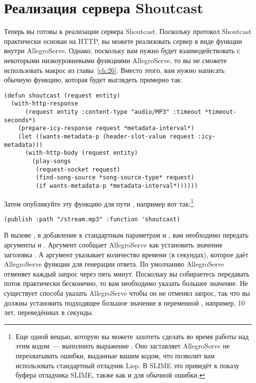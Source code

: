 \section{Реализация сервера Shoutcast}

Теперь вы готовы к реализации сервера Shoutcast. Поскольку протокол Shoutcast практически
основан на HTTP, вы можете реализовать сервер в виде функции внутри AllegroServe.  Однако,
поскольку вам нужно будет взаимодействовать с некоторыми низкоуровневыми функциями
AllegroServe, то вы не сможете использовать макрос  из
главы~\ref{ch:26}. Вместо этого, вам нужно написать обычную функцию, которая будет
выглядеть примерно так:

\begin{lstlisting}
(defun shoutcast (request entity)
  (with-http-response
      (request entity :content-type "audio/MP3" :timeout *timeout-seconds*)
    (prepare-icy-response request *metadata-interval*)
    (let ((wants-metadata-p (header-slot-value request :icy-metadata)))
      (with-http-body (request entity)
        (play-songs 
         (request-socket request)
         (find-song-source *song-source-type* request)
         (if wants-metadata-p *metadata-interval*))))))
\end{lstlisting}

Затем опубликуйте эту функцию для пути , например вот так:\footnote{Еще
  одной вещью, которую вы можете захотеть сделать во время работы над этим кодом~---
  выполнить выражение .  Оно заставляет AllegroServe
  не перехватывать ошибки, выданные вашим кодом, что позволит вам использовать стандартный
  отладчик Lisp.  В SLIME это приведёт к показу буфера отладчика SLIME, также как и для
  обычной ошибки.}

\begin{lstlisting}
(publish :path "/stream.mp3" :function 'shoutcast)
\end{lstlisting}

В вызове , в добавление к стандартным параметрам  и
, вам необходимо передать аргументы  и .
Аргумент  сообщает AllegroServe как установить значение заголовка
.  А аргумент  указывает количество времени (в
секундах), которое даёт AllegroServe функции для генерации ответа. По умолчанию
AllegroServe отменяет каждый запрос через пять минут.  Поскольку вы собираетесь передавать
поток практически бесконечно, то вам необходимо указать большее значение.  Не существует
способа указать AllegroServe чтобы он не отменял запрос, так что вы должны установить
подходящее большое значение в переменной , например, 10 лет,
переведённых в секунды.

